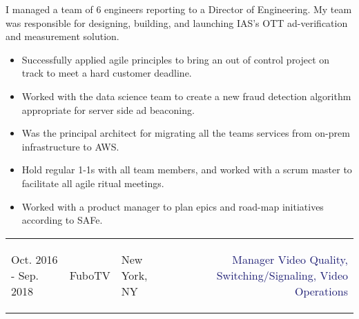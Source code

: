 \documentclass{article}
\begin{document}
\vspace{3pt} I managed a team of 6 engineers reporting to a Director of Engineering. My team was responsible for designing, building, and
launching IAS's OTT ad-verification and measurement solution. 
\vspace{3pt}\begin{multicols}{2}
  \begin{small}
    \begin{itemize}[leftmargin=*,label=\tiny{$\bullet$}]
    \item\begin{minipage}[t]{\linewidth}{Successfully applied agile principles to bring an out of control project on track to meet a hard customer deadline.}\end{minipage}
    \item\begin{minipage}[t]{\linewidth}{Worked with the data science team to create a new fraud detection algorithm appropriate for server side ad beaconing.}\end{minipage}
    \item\begin{minipage}[t]{\linewidth}{Was the principal architect for migrating all the teams services from on-prem infrastructure to AWS.}\end{minipage}
    \item\begin{minipage}[t]{\linewidth}{Hold regular 1-1s with all team members, and worked with a scrum master to facilitate all agile ritual meetings.}\end{minipage}
    \item\begin{minipage}[t]{\linewidth}{Worked with a product manager to plan epics and road-map initiatives according to SAFe.}\end{minipage}
    \end{itemize}
  \end{small} 
\end{multicols}

\pagebreak 
\begin{tabularx}{\textwidth}{@{}lllXr}
  Oct. 2016 - Sep. 2018&\textcolor{Mahogany}{FuboTV}&\textcolor{Black!80}{New York, NY}&&
  \textcolor{MidnightBlue}{\begin{minipage}[t]{3in}{Manager Video Quality, Switching/Signaling, Video Operations}\end{minipage}}\\
\end{tabularx}
\end{document}

